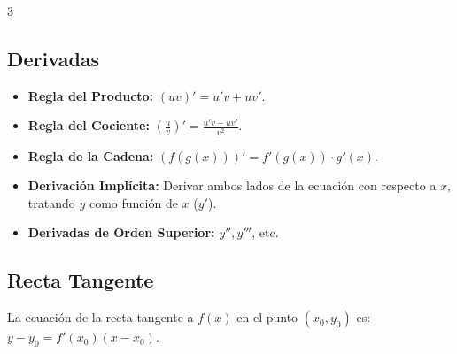 \documentclass[8pt,letterpaper]{article}
\begin{document}
\begin{multicols*}{3}
\subsection*{Derivadas}
\begin{itemize}
    \item \textbf{Regla del Producto:} $(uv)' = u'v + uv'$.
    \item \textbf{Regla del Cociente:} $\left(\frac{u}{v}\right)' = \frac{u'v - uv'}{v^2}$.
    \item \textbf{Regla de la Cadena:} $(f(g(x)))' = f'(g(x)) \cdot g'(x)$.
    \item \textbf{Derivación Implícita:} Derivar ambos lados de la ecuación con respecto a $x$, tratando $y$ como función de $x$ ($y'$).
    \item \textbf{Derivadas de Orden Superior:} $y'', y'''$, etc.
\end{itemize}

\subsection*{Recta Tangente}
La ecuación de la recta tangente a $f(x)$ en el punto $(x_0, y_0)$ es:
$y - y_0 = f'(x_0)(x - x_0)$.

\end{multicols*}
\end{document}
